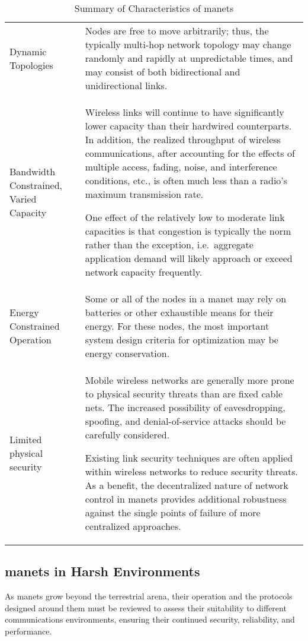 \begin{table}[h!]
\caption[Summary of Characteristics of \glspl{manet}]{Summary of Characteristics of \glspl{manet}\cite{Corson1999}}
\label{tab:manet_characteristics}
  \begin{tabularx}{\textwidth}{p{2cm}X}\toprule
    Dynamic Topologies & Nodes are free to move arbitrarily; thus, the typically multi-hop network topology may change randomly and rapidly at unpredictable times, and may consist of both bidirectional and unidirectional links.
\\
    Bandwidth Constrained, Varied Capacity & Wireless links will continue to have significantly lower capacity than their hardwired counterparts.
In addition, the realized throughput of wireless communications, after accounting for the effects of multiple access, fading, noise, and interference conditions, etc., is often much less than a radio's maximum transmission rate.
\par
One effect of the relatively low to moderate link capacities is that congestion is typically the norm rather than the exception, i.e.\  aggregate application demand will likely approach or exceed network capacity frequently.\\
    Energy Constrained Operation &  Some or all of the nodes in a \gls{manet} may rely on batteries or other exhaustible means for their energy.
For these nodes, the most important system design criteria for optimization may be energy conservation.\\
    Limited physical security & Mobile wireless networks are generally more prone to physical security threats than are fixed cable nets.
The increased possibility of eavesdropping, spoofing, and denial-of-service attacks should be carefully considered.\par
Existing link security techniques are often applied within wireless networks to reduce security threats.
As a benefit, the decentralized nature of network control in \glspl{manet} provides additional robustness against the single points of failure of more centralized approaches.\\\bottomrule
\end{tabularx}
\end{table}


\subsection{\glspl{manet} in Harsh Environments}

As \glspl{manet} grow beyond the terrestrial arena, their operation and the protocols designed around them must be reviewed to assess their suitability to different communications environments, ensuring their continued security, reliability, and performance.

